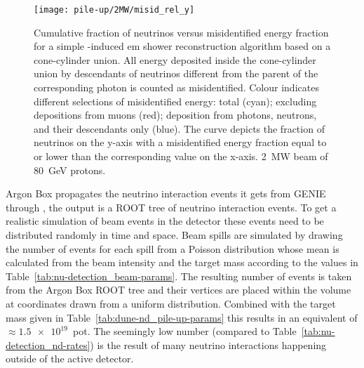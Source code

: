 \begin{figure}[htb]
	\centering
	\texttt{[image: pile-up/2MW/misid\_rel\_y]}
	\caption[Pile-up study neutrino vs.\ misidentified energy fraction, \SI{2}{\mega\watt} beam]{%
		Cumulative fraction of neutrinos versus misidentified energy fraction for a simple \Pgpz-induced \acrshort{em} shower reconstruction algorithm based on a cone-cylinder union.
		All energy deposited inside the cone-cylinder union by descendants of neutrinos different from the parent of the corresponding \Pgpz photon is counted as misidentified.
		Colour indicates different selections of misidentified energy: total (cyan); excluding depositions from muons (red); deposition from photons, neutrons, and their descendants only (blue).
		The curve depicts the fraction of neutrinos on the y-axis with a misidentified energy fraction equal to or lower than the corresponding value on the x-axis.
		\SI{2}{\mega\watt} beam of \SI{80}{\giga\electronvolt} protons.
	}
	\label{fig:dune-nd_2MW_misid-rel-y}
\end{figure}

Argon Box propagates the neutrino interaction events it gets from GENIE through \lar{}, the output is a ROOT tree of neutrino interaction events.
To get a realistic simulation of beam events in the detector these events need to be distributed randomly in time and space.
Beam spills are simulated by drawing the number of events for each spill from a Poisson distribution whose mean is calculated from the beam intensity and the target mass according to the values in Table~\ref{tab:nu-detection_beam-params}.
The resulting number of events is taken from the Argon Box ROOT tree and their vertices are placed within the \lar{} volume at coordinates drawn from a uniform distribution.
Combined with the target mass given in Table~\ref{tab:dune-nd_pile-up-params} this results in an equivalent of $\approx \num{1.5e19}$~\gls{pot}.
The seemingly low number (compared to Table~\ref{tab:nu-detection_nd-rates}) is the result of many neutrino interactions happening outside of the active detector.

